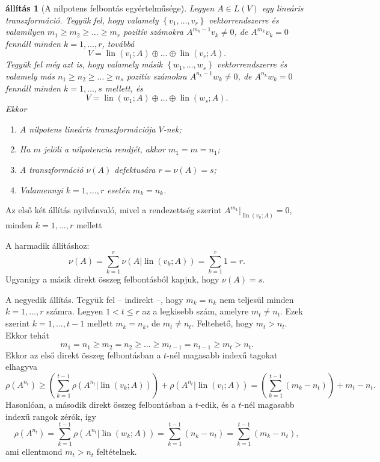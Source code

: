 \documentclass[a4paper, showtrims]{memoir}
\makeatletter
\renewenvironment{proof}[1][\proofname]
    {\par\pushQED{\qed}%
    \normalfont \topsep6\p@\@plus6\p@\relax
    \trivlist
    \item[\hskip\labelsep
        \itshape
    #1\@addpunct{:}]\ignorespaces}
    {\popQED\endtrivlist\@endpefalse}
\theoremstyle{plain}
\newtheorem{proposition}{állítás}[chapter]
\theoremstyle{remark}
\theoremstyle{definition}
\DeclareMathOperator{\lin}{lin}
\makeatother
\begin{document}
\begin{proposition}[A nilpotens felbontás egyértelműsége]
	Legyen $A\in L\left( V \right)$ egy lineáris transzformáció.
	Tegyük fel, hogy valamely $\left\{ v_1,\ldots,v_r \right\}$ vektorrendszerre és valamilyen
	$m_1\geq m_2\geq \dots\geq m_r$ pozitív számokra
	$A^{m_k-1}v_k\neq 0$, de $A^{m_k}v_k=0$ fennáll minden $k=1,\ldots,r$, továbbá
	\[
		V=\lin(v_1;A)\oplus \dots \oplus\lin(v_r;A).
	\]
	Tegyük fel még azt is,
	hogy valamely másik $\left\{ w_1,\ldots,w_s \right\}$ vektorrendszerre és valamely más
	$n_1\geq n_2\geq \dots\geq n_s$ pozitív számokra
	$A^{n_k-1}w_k\neq 0$, de $A^{n_k}w_k=0$ fennáll minden $k=1,\ldots,s$ mellett, és
	\[
		V=\lin(w_1;A)\oplus \dots \oplus\lin(w_s;A).
	\]
	Ekkor
	\begin{enumerate}
		\item $A$ nilpotens lineáris transzformációja $V$-nek;
		\item Ha $m$ jelöli a nilpotencia rendjét, akkor
		      \(
		      m_1=m=n_1
		      \);
		\item A transzformáció $\nu\left( A \right)$ defektusára
		      \(
		      r=\nu\left( A \right)=s
		      \);
		\item Valamennyi $k=1,\ldots,r$ esetén
		      \(
		      m_k=n_k
		      \).\qedhere
	\end{enumerate}
\end{proposition}
\begin{proof}
	Az első két állítás nyilvánvaló, mivel a rendezettség szerint
    $A^{m_1}|_{\lin(v_k;A)}=0$,
	minden $k=1,\ldots,r$ mellett

	A harmadik állításhoz:
	\[
		\nu\left( A \right)=\sum_{k=1}^r\nu\left( A|\lin(v_k;A) \right)=
		\sum_{k=1}^r1=r.
	\]
	Ugyanígy a másik direkt összeg felbontásból kapjuk, hogy $\nu\left( A \right)=s$.

	A negyedik állítás.
	Tegyük fel -- indirekt --, hogy $m_k=n_k$ nem teljesül minden $k=1,\ldots,r$ számra.
	Legyen $1<t\leq r$ az a legkisebb szám, amelyre $m_t\neq n_t$.
	Ezek szerint $k=1,\ldots,t-1$ mellett $m_k=n_k$, de $m_t\neq n_t$.
	Feltehető, hogy $m_t>n_t$.
	Ekkor tehát
	\[
		m_1=n_1\geq m_2=n_2\geq\dots\geq m_{t-1}=n_{t-1}\geq m_t>n_t.
	\]
	Ekkor az első direkt összeg felbontásban a $t$-nél magasabb indexű tagokat elhagyva
	\[
		\rho\left( A^{n_t} \right)
		\geq
		\left( \sum_{k=1}^{t-1}\rho\left( A^{n_t}|\lin(v_k;A) \right) \right)
		+\rho\left( A^{n_t}|\lin(v_t;A) \right)
		=
		\left( \sum_{k=1}^{t-1}(m_k-n_t) \right)+m_t-n_t.
	\]
	Hasonlóan, a második direkt összeg felbontásban a $t$-edik, és a $t$-nél magasabb indexű rangok zérók, így
	\[
		\rho\left( A^{n_t} \right)
		=
		\sum_{k=1}^{t-1}\rho\left( A^{n_t}|\lin(w_k;A) \right)
		=
		\sum_{k=1}^{t-1}(n_k-n_t)
		=
		\sum_{k=1}^{t-1}(m_k-n_t),
	\]
	ami ellentmond $m_t>n_t$ feltételnek.
\end{proof}
\end{document}
